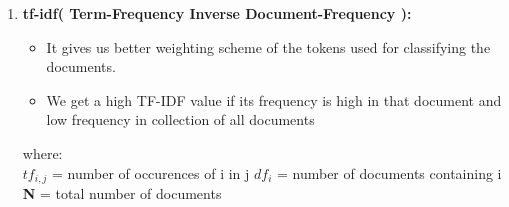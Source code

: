 \documentclass{beamer}
\begin{document}
\begin{frame}[t, allowframebreaks]
\begin{enumerate}
\item \textbf{tf-idf( Term-Frequency Inverse Document-Frequency ):}\\
\begin{itemize}
\item It gives us better weighting scheme of the tokens used for classifying the documents.
\item We get a high TF-IDF value if its frequency is high in that document and low frequency in collection of all documents

\end{itemize}

\begin{multicols}{2}
\setlength\columnsep{0pt}

\centering
\normalsize \textbf {}
\linebreak

\vspace{1cm}
\scriptsize
\begin{raggedright}
where:\\
\textbf{\scriptsize \(tf_{i,j} \) }= number of occurences of i in j
\linebreak
\textbf{\scriptsize \(df_i \)} = number of documents containing i
\linebreak
\textbf{\scriptsize N} = total number of documents\\
\end{raggedright}
\end{multicols}


\end{enumerate}
\end{frame}
\end{document}
